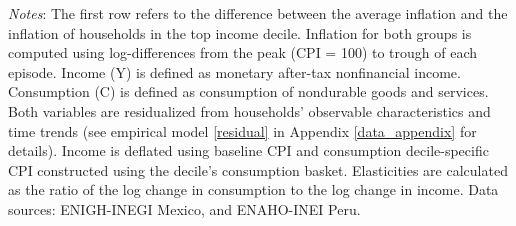 \documentclass[12pt]{article}
\begin{document}
\begin{spacing}{1.5}
\begin{table}[H]
\begin{centering}
\par\end{centering}
\medskip{}

\raggedright{}\textit{\footnotesize{}Notes}{\footnotesize{}: The first row refers to the difference between the average inflation and the inflation of households in the top income decile. Inflation for both groups is computed using log-differences from the peak (CPI = 100) to trough of each episode. Income (Y) is defined as monetary after-tax nonfinancial income. Consumption (C) is defined as consumption of nondurable goods and services. Both variables are residualized from households' observable characteristics and time trends (see empirical model \eqref{residual} in Appendix \ref{data_appendix} for details). Income is deflated using baseline CPI and consumption decile-specific CPI constructed using the decile's consumption basket. Elasticities are calculated as the ratio of the log change in consumption to the log change in income. Data sources: ENIGH-INEGI Mexico, and ENAHO-INEI Peru.}{\footnotesize\par}
\end{table}





\end{spacing}
\end{document}
